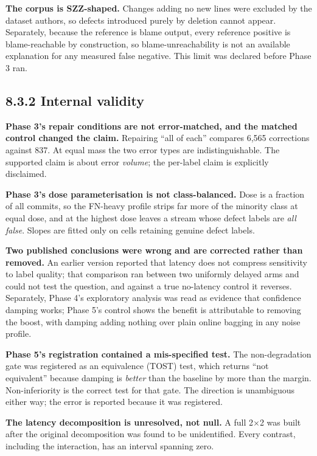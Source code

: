 \textbf{The corpus is SZZ-shaped.} Changes adding no new lines were
excluded by the dataset authors, so defects introduced purely by
deletion cannot appear. Separately, because the reference is blame
output, every reference positive is blame-reachable by construction, so
blame-unreachability is not an available explanation for any measured
false negative. This limit was declared before Phase 3 ran.

\subsection{8.3.2 Internal validity}\label{internal-validity}

\textbf{Phase 3's repair conditions are not error-matched, and the
matched control changed the claim.} Repairing ``all of each'' compares
6,565 corrections against 837. At equal mass the two error types are
indistinguishable. The supported claim is about error \emph{volume}; the
per-label claim is explicitly disclaimed.

\textbf{Phase 3's dose parameterisation is not class-balanced.} Dose is
a fraction of all commits, so the FN-heavy profile strips far more of
the minority class at equal dose, and at the highest dose leaves a
stream whose defect labels are \emph{all false}. Slopes are fitted only
on cells retaining genuine defect labels.

\textbf{Two published conclusions were wrong and are corrected rather
than removed.} An earlier version reported that latency does not
compress sensitivity to label quality; that comparison ran between two
uniformly delayed arms and could not test the question, and against a
true no-latency control it reverses. Separately, Phase 4's exploratory
analysis was read as evidence that confidence damping works; Phase 5's
control shows the benefit is attributable to removing the boost, with
damping adding nothing over plain online bagging in any noise profile.

\textbf{Phase 5's registration contained a mis-specified test.} The
non-degradation gate was registered as an equivalence (TOST) test, which
returns ``not equivalent'' because damping is \emph{better} than the
baseline by more than the margin. Non-inferiority is the correct test
for that gate. The direction is unambiguous either way; the error is
reported because it was registered.

\textbf{The latency decomposition is unresolved, not null.} A full 2\ensuremath{\times}2
was built after the original decomposition was found to be unidentified.
Every contrast, including the interaction, has an interval spanning
zero.

